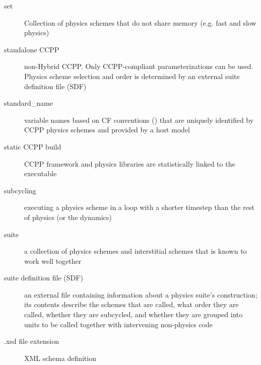 \documentclass[letterpaper,10pt,english]{sphinxmanual}
\begin{document}
\begin{description}
\item[{set\label{\detokenize{Glossary:term-set}}}] \leavevmode
Collection of physics schemes that do not share memory (e.g. fast and slow physics)

\item[{standalone CCPP\label{\detokenize{Glossary:term-standalone-ccpp}}}] \leavevmode
non-Hybrid CCPP. Only CCPP-compliant parameterizations can be used. Physics scheme
selection and order is determined by an external suite definition file (SDF)

\item[{standard\_name\label{\detokenize{Glossary:term-standard-name}}}] \leavevmode
variable names based on CF conventions () that are uniquely
identified by CCPP physics schemes and provided by a host model

\item[{static CCPP build\label{\detokenize{Glossary:term-static-ccpp-build}}}] \leavevmode
CCPP framework and physics libraries are statistically linked to the executable

\item[{subcycling\label{\detokenize{Glossary:term-subcycling}}}] \leavevmode
executing a physics scheme in a loop with a shorter timestep than the rest of physics (or the dynamics)

\item[{suite\label{\detokenize{Glossary:term-suite}}}] \leavevmode
a collection of physics schemes and interstitial schemes that is known to work well together

\item[{suite definition file (SDF)\label{\detokenize{Glossary:term-suite-definition-file-sdf}}}] \leavevmode
an external file containing information about a physics suite’s construction; its contents
describe the schemes that are called, what order they are called, whether they are subcycled,
and whether they are grouped into units to be called together with intervening non-physics code

\item[{.xsd file extension\label{\detokenize{Glossary:term-xsd-file-extension}}}] \leavevmode
XML schema definition

\end{description}
\end{document}
